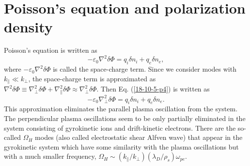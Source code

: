 \documentclass{llncs}
\begin{document}
\section{Poisson's equation and polarization density}\label{19-1-4-1}

Poisson's equation is written as
\begin{equation}
  \label{18-10-5-p4} - \varepsilon_0 \nabla^2 \delta \Phi = q_i \delta n_i +
  q_e \delta n_e,
\end{equation}
where $- \varepsilon_0 \nabla^2 \delta \Phi$ is called the space-charge term.
Since we consider modes with $k_{\parallel} \ll k_{\perp}$, the space-charge
term is approximated as $\nabla^2 \delta \Phi \equiv \nabla^2_{\perp} \delta
\Phi + \nabla^2_{\parallel} \delta \Phi \approx \nabla^2_{\perp} \delta \Phi$.
Then Eq. (\ref{18-10-5-p4}) is written as
\begin{equation}
  \label{19-1-12-e2} - \varepsilon_0 \nabla^2_{\perp} \delta \Phi = q_i \delta
  n_i + q_e \delta n_e .
\end{equation}
This approximation eliminates the parallel plasma oscillation from the system.
The perpendicular plasma oscillations seem to be only partially eliminated in
the system consisting of gyrokinetic ions and drift-kinetic electrons. There
are the so-called $\Omega_H$ modes (also called electrostatic shear Alfven
wave) that appear in the gyrokinetic system which have some similarity with
the plasma oscillations but with a much smaller frequency, $\Omega_H \sim
(k_{\parallel} / k_{\perp}) (\lambda_D / \rho_s) \omega_{p e}$.
\end{document}
